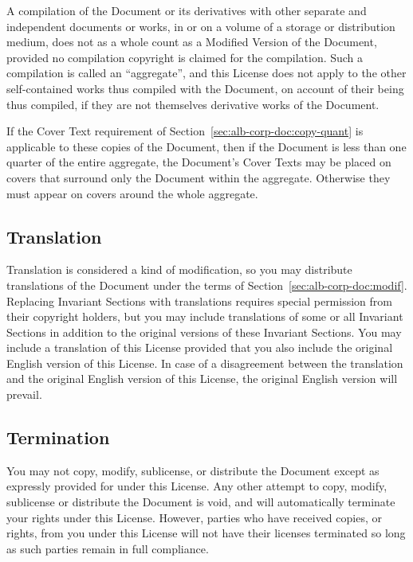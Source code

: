 \documentclass[11pt,letter,oneside]{article}
\begin{document}
\begin{albTitlePage}
A compilation of the Document or its derivatives with other separate and
independent documents or works, in or on a volume of a storage or
distribution medium, does not as a whole count as a Modified Version of
the Document, provided no compilation copyright is claimed for the
compilation.  Such a compilation is called an ``aggregate'', and this
License does not apply to the other self-contained works thus compiled
with the Document, on account of their being thus compiled, if they are
not themselves derivative works of the Document.

If the Cover Text requirement of
Section~\ref{sec:alb-corp-doc:copy-quant} is applicable to these copies
of the Document, then if the Document is less than one quarter of the
entire aggregate, the Document's Cover Texts may be placed on covers
that surround only the Document within the aggregate.  Otherwise they
must appear on covers around the whole aggregate.


\subsection{Translation}
\label{sec:alb-corp-doc:transl}

Translation is considered a kind of modification, so you may distribute
translations of the Document under the terms of
Section~\ref{sec:alb-corp-doc:modif}.  Replacing Invariant Sections with
translations requires special permission from their copyright holders,
but you may include translations of some or all Invariant Sections in
addition to the original versions of these Invariant Sections.  You may
include a translation of this License provided that you also include the
original English version of this License.  In case of a disagreement
between the translation and the original English version of this
License, the original English version will prevail.


\subsection{Termination}
\label{sec:alb-corp-doc:term}

You may not copy, modify, sublicense, or distribute the Document except
as expressly provided for under this License.  Any other attempt to
copy, modify, sublicense or distribute the Document is void, and will
automatically terminate your rights under this License.  However,
parties who have received copies, or rights, from you under this License
will not have their licenses terminated so long as such parties remain
in full compliance.



\end{albTitlePage}
\end{document}
